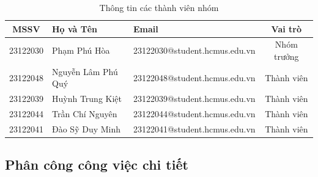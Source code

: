 \documentclass[12pt,a4paper]{article}
\let\oldtextbf\textbf
\renewcommand{\textbf}[1]{\oldtextbf{\textcolor{hcmublue}{#1}}}
\begin{document}
\begin{table}[H]
\centering
\begin{tabular}{|c|l|l|c|}
\hline
\textbf{MSSV} & \textbf{Họ và Tên} & \textbf{Email} & \textbf{Vai trò} \\ \hline
23122030 & Phạm Phú Hòa        & 23122030@student.hcmus.edu.vn & Nhóm trưởng \\ \hline
23122048 & Nguyễn Lâm Phú Quý  & 23122048@student.hcmus.edu.vn & Thành viên  \\ \hline
23122039 & Huỳnh Trung Kiệt    & 23122039@student.hcmus.edu.vn & Thành viên  \\ \hline
23122044 & Trần Chí Nguyên     & 23122044@student.hcmus.edu.vn & Thành viên  \\ \hline
23122041 & Đào Sỹ Duy Minh     & 23122041@student.hcmus.edu.vn & Thành viên  \\ \hline
\end{tabular}
\caption{Thông tin các thành viên nhóm}
\label{tab:team_info}
\end{table}

\subsection{Phân công công việc chi tiết}
\end{document}
